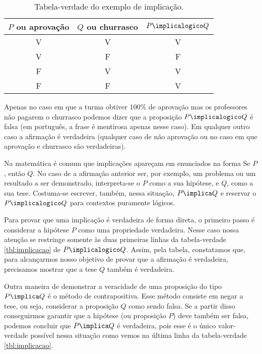 \begin{table}[h]
	\centering
	\begin{tabular}{cc|c}
		$P$ ou aprovação		& $Q$ ou churrasco 		& $P \implicalogico Q$ \\ \hline
		V		& V			& V			           \\
		V		& F			& F			           \\
		F		& V			& V			           \\
		F		& F			& V			           \\	
	\end{tabular}
	\caption{Tabela-verdade do exemplo de implicação.}
	\label{tbl:eximplicacao}
\end{table}

Apenas no caso em que a turma obtiver 100\% de aprovação mas os professores não pagarem o churrasco podemos dizer que a proposição $P \implicalogico Q$ é falsa (em português, a frase é mentirosa apenas nesse caso). Em qualquer outro caso a afirmação é verdadeira (qualquer caso de não aprovação ou no caso em que aprovação e churrasco são verdadeiras).


Na matemática é comum que implicações apareçam em enunciados na forma \abreaspas Se $P$, então $Q$\fechaaspas.
No caso de a afirmação anterior ser, por exemplo, um problema ou um resultado a ser demonstrado, interpreta-se o $P$ como a sua hipótese, e $Q$, como a sua tese. Costuma-se escrever, também, nessa situação, $P \implica Q$ e reservar o $P \implicalogico Q$ para contextos puramente lógicos.

Para provar que uma implicação é verdadeira de forma direta, o primeiro passo é considerar a hipótese $P$ como uma propriedade verdadeira. Nesse caso nossa atenção se restringe somente às duas primeiras linhas da tabela-verdade \ref{tbl:implicacao} de $P \implicalogico Q$.
Assim, pela tabela, constatamos que, para alcançarmos nosso objetivo de provar que a afirmação  é verdadeira, precisamos mostrar que a tese $Q$ também é verdadeira.

Outra maneira de demonstrar a veracidade de uma proposição do tipo $P \implica Q$ é o método de contrapositiva. Esse método consiste em negar a tese, ou seja, considerar a proposição $Q$ como sendo falsa. Se a partir disso conseguirmos garantir que a hipótese (ou proposição $P$) deve também ser falsa, podemos concluir que $P \implica Q$ é verdadeira, pois esse é o único valor-verdade possível nessa situação como vemos na última linha da tabela-verdade \ref{tbl:implicacao}. 

